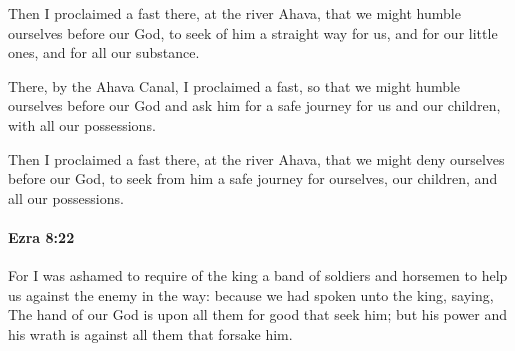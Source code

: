 			\begin{versebox}
					\item[BHS] 
					\item[LXX] 
					\item[ASV] Then I proclaimed a fast there, at the river Ahava, that we might humble ourselves before our God, to seek of him a straight way for us, and for our little ones, and for all our substance.
					\item[NIV] There, by the Ahava Canal, I proclaimed a fast, so that we might humble ourselves before our God and ask him for a safe journey for us and our children, with all our possessions.
					\item[NRSV] Then I proclaimed a fast there, at the river Ahava, that we might deny ourselves before our God, to seek from him a safe journey for ourselves, our children, and all our possessions.
			\end{versebox}

		\paragraph{Ezra 8:22} %
			\label{EZRA-8-22}

			For I was ashamed to require of the king a band of soldiers and horsemen to help us against the enemy in the way: because we had spoken unto the king, saying, The hand of our God is upon all them for good that seek him; but his power and his wrath is against all them that forsake him.

